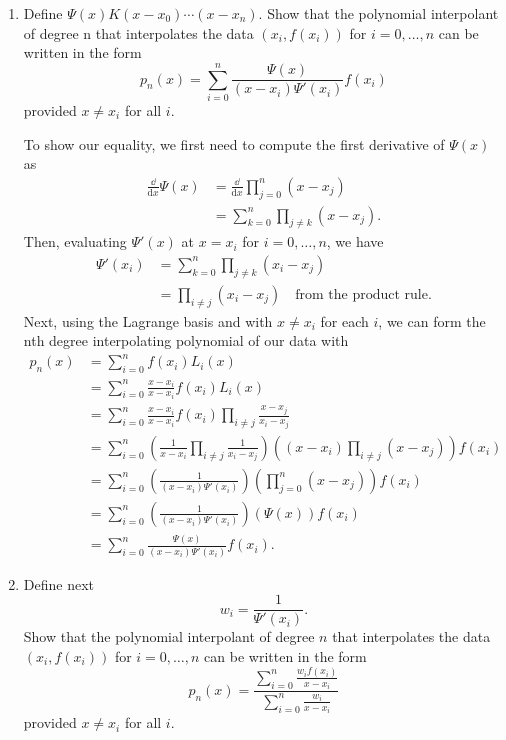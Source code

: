 \documentclass[a4paper,12pt]{article}
\newcommand{\dd}[1]{\mathrm{d}#1}
\begin{document}
\begin{enumerate}[label = \arabic*)]
\begin{enumerate}[label = (\roman*)]
			\item Define $ \Psi(x) K (x - x_0) \cdots (x - x_n) $. Show that the polynomial interpolant of degree n that interpolates the data $ (x_i, f(x_i)) $ for $ i = 0, \ldots, n $ can be written in the form 
			\[
				p_n(x) = \sum_{i=0}^{n} \frac{\Psi(x)}{(x - x_i) \Psi'(x_i)} f(x_i)
			\]
			provided $ x \neq x_i $ for all $ i $.
			
			To show our equality, we first need to compute the first derivative of $ \Psi(x) $ as
			\begin{align*}
				\frac{\dd}{\dd x} \Psi(x) &= \frac{\dd}{\dd x} \prod_{j= 0}^{n} (x - x_j) \\
				&= \sum_{k = 0}^n \prod_{j \neq k} (x - x_j).
			\end{align*}
			Then, evaluating $ \Psi'(x) $ at $ x = x_i $ for $ i = 0, \ldots, n $, we have
			\begin{align*}
				\Psi'(x_i) &= \sum_{k = 0}^n \prod_{j \neq k} (x_i - x_j) \\
				&= \prod_{i \neq j}(x_i - x_j) \quad \text{from the product rule.}
			\end{align*}
			Next, using the Lagrange basis and with $ x \neq  x_i $ for each $ i $, we can form the nth degree interpolating polynomial of our data with
			\begin{align*}
				p_n(x) &= \sum_{i = 0}^{n} f(x_i) L_i(x) \\
				&= \sum_{i = 0}^{n} \frac{x - x_i}{x - x_i} f(x_i) L_i(x) \\
				&= \sum_{i = 0}^{n} \frac{x - x_i}{x - x_i} f(x_i) \prod_{i \neq j} \frac{x - x_j}{x_i - x_j} \\
				&= \sum_{i = 0}^{n} \left(\frac{1}{x - x_i} \prod_{i \neq j} \frac{1}{x_i - x_j} \right)  \left((x - x_i)\prod_{i \neq j} (x - x_j)\right) f(x_i) \\
				&= \sum_{i = 0}^{n} \left(\frac{1}{(x - x_i) \Psi'(x_i)}\right)  \left(\prod_{j = 0}^n (x - x_j)\right) f(x_i) \\
				&= \sum_{i = 0}^{n} \left(\frac{1}{(x - x_i) \Psi'(x_i)}\right)  \left(\Psi(x)\right) f(x_i) \\
				&= \sum_{i = 0}^n \frac{\Psi(x)}{(x - x_i) \Psi'(x_i)} f(x_i).
			\end{align*}
		
			\newpage
			\item Define next
			\[
				w_i = \frac{1}{\Psi'(x_i)}.
			\]
			Show that the polynomial interpolant of degree $ n $ that interpolates the data $ (x_i, f(x_i)) $ for $ i = 0, \ldots, n $ can be written in the form
			\[
				p_n(x) = \frac{\sum_{i = 0}^{n} \frac{w_i f(x_i)}{x - x_i}}{\sum_{i = 0}^{n} \frac{w_i}{x - x_i}}
			\]
			provided $ x \neq x_i $ for all $ i $.
			

\end{enumerate}
\end{enumerate}
\end{document}

